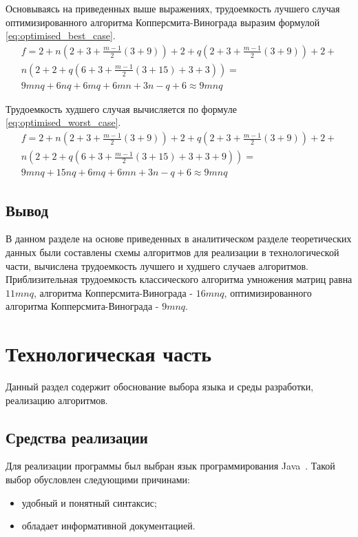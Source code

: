 \documentclass[12pt]{report}
\begin{document}
    Основываясь на приведенных выше выражениях, трудоемкость лучшего случая
    оптимизированного алгоритма Копперсмита-Винограда выразим формулой \ref{eq:optimised_best_case}.
    \begin{equation}
        \label{eq:optimised_best_case}
        \begin{array}{ll}
            f = 2 + n(2 + 3 + \frac{m-1}{2}(3 + 9)) + 2 + q(2 + 3 + \frac{m-1}{2}(3 + 9)) + 2 + \\
            n(2 + 2 + q(6 + 3 + \frac{m-1}{2}(3 + 15) + 3 + 3)) =                               \\
            9mnq + 6nq + 6mq + 6mn+3n-q+6 \approx 9mnq
        \end{array}
    \end{equation}

    Трудоемкость худшего случая вычисляется по формуле \ref{eq:optimised_worst_case}.
    \begin{equation}
        \label{eq:optimised_worst_case}
        \begin{array}{ll}
            f = 2 + n(2 + 3 + \frac{m-1}{2}(3 + 9)) + 2 + q(2 + 3 + \frac{m-1}{2}(3 + 9)) + 2 + \\
            n(2 + 2 + q(6 + 3 + \frac{m-1}{2}(3 + 15) + 3 + 3 + 9)) =                           \\
            9mnq+15nq+6mq+6mn+3n-q+6\approx 9mnq
        \end{array}
    \end{equation}


    \section{Вывод}
    В данном разделе на основе приведенных в аналитическом разделе теоретических данных
    были составлены схемы алгоритмов для реализации в технологической части,
    вычислена трудоемкость лучшего и худшего случаев алгоритмов.
    Приблизительная трудоемкость классического алгоритма умножения матриц равна $11mnq$,
    алгоритма Копперсмита-Винограда - $16mnq$,
    оптимизированного алгоритма Копперсмита-Винограда - $9mnq$.
    \newpage


    \chapter{Технологическая часть}
    Данный раздел содержит обоснование выбора языка и среды разработки, реализацию алгоритмов.


    \section{Средства реализации}
    Для реализации программы был выбран язык программирования Java~\cite{java}.
    Такой выбор обусловлен следующими причинами:
    \begin{itemize}
        \item удобный и понятный синтаксис;
        \item обладает информативной документацией.
    \end{itemize}
\end{document}
